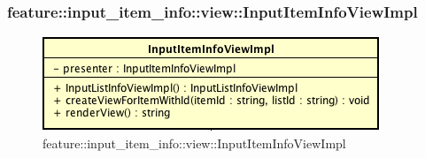\subsubsection{feature::input\_item\_info::view::InputItemInfoViewImpl}

\label{feature::input_item_info::view::InputItemInfoViewImpl}
\begin{figure}[H]
	\centering
	\includegraphics[scale=0.5]{Sezioni/SottosezioniST/img/app/InputItemInfoViewImpl.png}
	\caption{feature::input\_item\_info::view::InputItemInfoViewImpl}
\end{figure}

